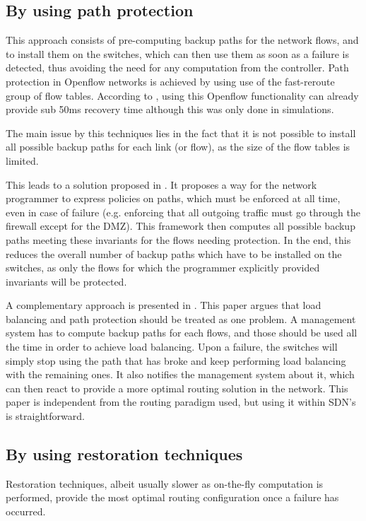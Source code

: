 \documentclass[]{IEEEtran}
\begin{document}
\subsection{By using path protection}
This approach consists of pre-computing backup paths for the network flows, and to install them on the switches, which can then use them as soon as a failure is detected, thus avoiding the need for any computation from the controller. Path protection in Openflow networks is achieved by using use of the fast-reroute group of flow tables. According to \cite{Sharma:2013:OMC:2445634.2445903}, using this Openflow functionality can already provide sub 50ms recovery time although this was only done in simulations.

The main issue by this techniques lies in the fact that it is not possible to install all possible backup paths for each link (or flow), as the size of the flow tables is limited.

This leads to a solution proposed in \cite{Reitblatt:2013:FDF:2491185.2491187}. It proposes a way for the network programmer to express policies on paths, which must be enforced at all time, even in case of failure (e.g. enforcing that all outgoing traffic must go through the firewall except for the DMZ). This framework then computes all possible backup paths meeting these invariants for the flows needing protection. In the end, this reduces the overall number of backup paths which have to be installed on the switches, as only the flows for which the programmer explicitly provided invariants will be protected.

A complementary approach is presented in \cite{Suchara:2011:NAJ:1993744.1993756}. This paper argues that load balancing and path protection should be treated as one problem. A management system has to compute backup paths for each flows, and those should be used all the time in order to achieve load balancing. Upon a failure, the switches will simply stop using the path that has broke and keep performing load balancing with the remaining ones. It also notifies the management system about it, which can then react to provide a more optimal routing solution in the network. This paper is independent from the routing paradigm used, but using it within SDN's is straightforward.

\subsection{By using restoration techniques}
Restoration techniques, albeit usually slower as on-the-fly computation is performed, provide the most optimal routing configuration once a failure has occurred.
\end{document}
